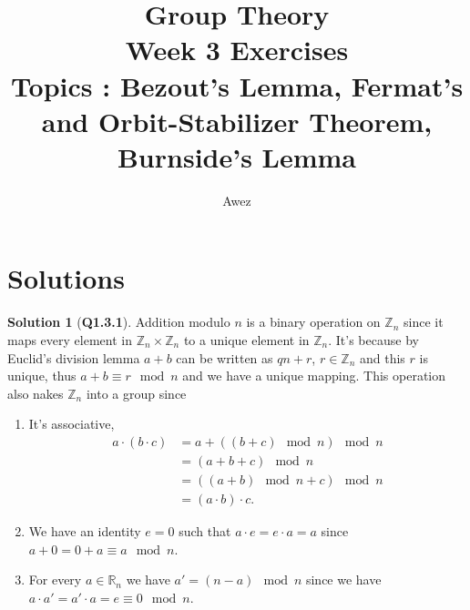\documentclass{article}
\title{\textbf{Group Theory} \\ Week 3 Exercises
\\ {\large Topics : Bezout's Lemma, Fermat's and Orbit-Stabilizer Theorem, Burnside's Lemma}}
\author{Awez}
\date{}
\theoremstyle{definition}
\newtheorem*{sol}{Solution}
\begin{document}
\maketitle

\section{Solutions}

\begin{sol}[\textbf{Q1.3.1}]
	Addition modulo $n$ is a binary operation on $\mathbb{Z}_n$ since it maps every element in $\mathbb{Z}_n\times \mathbb{Z}_n$ to a unique element in $\mathbb{Z}_n$. It's because by Euclid's division lemma $a+b$ can be written as $qn+r$, $r\in \mathbb{Z}_n$ and this $r$ is unique, thus $a+b\equiv r\mod{n}$ and we have a unique mapping. This operation also nakes $\mathbb{Z}_n$ into a group since
	\begin{enumerate}
		\item It's associative, \begin{align}
			      a\cdot(b\cdot c) & = a+((b+c)\mod{n})\mod{n} \\ &= (a+b+c)\mod{n}\\ &= ((a+b)\mod{n}+c)\mod{n}\\ &= (a\cdot b)\cdot c.
		      \end{align}
		\item We have an identity $e=0$ such that $a\cdot e = e\cdot a= a$ since $a+0 = 0+a \equiv a\mod{n}$.
		\item For every $a\in \mathbb{R}_n$ we have $a' = (n-a)\mod{n}$ since we have $a\cdot a' = a'\cdot a= e \equiv 0\mod{n}$.
	\end{enumerate}
\end{sol}
\end{document}
